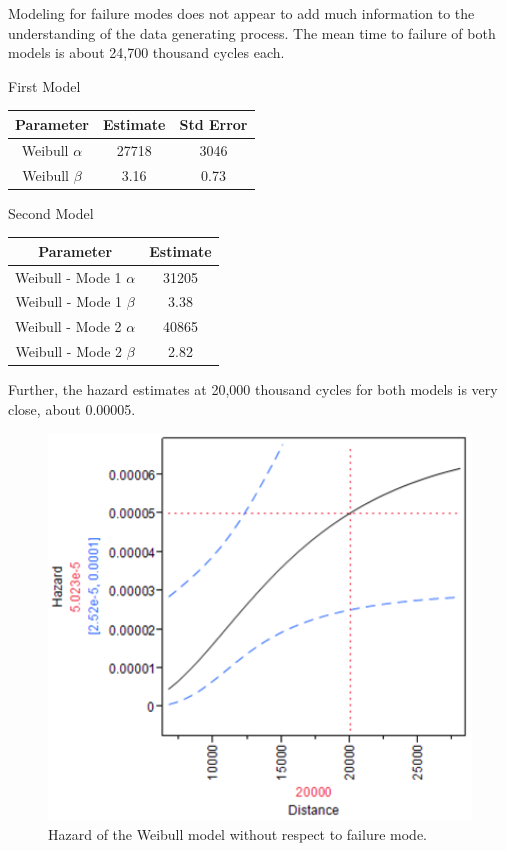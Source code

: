 \documentclass{article}
\begin{document}
\begin{enumerate}
\begin{enumerate}
\begin{enumerate}
  Modeling for failure modes does not appear to add much information to the understanding of the data generating process.  The mean time to failure of both models is about 24,700 thousand cycles each.
  
\begin{center}
First Model\\
\begin{tabular}{c c c}
\hline
Parameter & Estimate & Std Error\\
\hline
Weibull \(\alpha \) & 27718 & 3046\\
Weibull \(\beta \) & 3.16 & 0.73\\
\hline
\end{tabular}
\end{center}

\begin{center}
Second Model\\
\begin{tabular}{c c}
\hline
Parameter & Estimate\\
\hline
Weibull - Mode 1 \(\alpha \) & 31205\\
Weibull - Mode 1 \(\beta \) & 3.38\\
Weibull - Mode 2 \(\alpha \) & 40865\\
Weibull - Mode 2 \(\beta \) & 2.82\\
\hline
\end{tabular}
\end{center}
  
Further, the hazard estimates at 20,000 thousand cycles for both models is very close, about 0.00005.\\

\begin{center}
        \FloatBarrier
      \begin{figure}
        \centering
        \includegraphics[width = 5in]{problem5_hazard1.png}
        \caption{Hazard of the Weibull model without respect to failure mode.}
      \end{figure}
      \FloatBarrier
  \end{center}
  

\end{enumerate}
\end{enumerate}
\end{enumerate}
\end{document}
